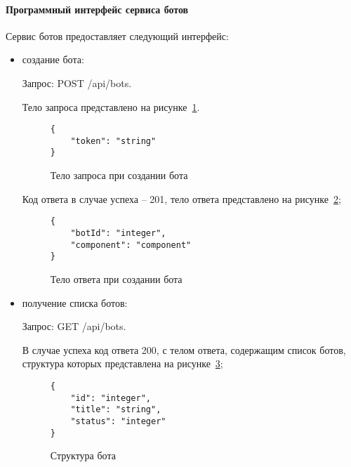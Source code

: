 \paragraph{Программный интерфейс сервиса ботов}

Сервис ботов предоставляет следующий интерфейс:
\begin{itemize}
	\item создание бота:

	      Запрос: POST /api/bots.

	      Тело запроса представлено на рисунке~\ref{f:add-bot-request-body}.

	      \begin{figure}[ht]
		      \centering
		      \vspace{\toppaddingoffigure}
		      \begin{lstlisting}
{
    "token": "string"
}
    \end{lstlisting}
		      \caption{Тело запроса при создании бота}
		      \label{f:add-bot-request-body}
	      \end{figure}

	      Код ответа в случае успеха – 201, тело ответа представлено на
	      рисунке~\ref{f:add-bot-response-body};

	      \begin{figure}[ht]
		      \centering
		      \vspace{\toppaddingoffigure}
		      \begin{lstlisting}
{
    "botId": "integer",
    "component": "component"
}
    \end{lstlisting}
		      \caption{Тело ответа при создании бота}
		      \label{f:add-bot-response-body}
	      \end{figure}

	\item получение списка ботов:

	      Запрос: GET /api/bots.

	      В случае успеха код ответа 200, с телом ответа, содержащим список
	      ботов, структура которых представлена
	      на рисунке~\ref{f:get-bot-response-body};


	      \begin{figure}[ht]
		      \centering
		      \vspace{\toppaddingoffigure}
		      \begin{lstlisting}
{
    "id": "integer",
    "title": "string",
    "status": "integer"
}
    \end{lstlisting}
		      \caption{Структура бота}
		      \label{f:get-bot-response-body}
	      \end{figure}


\end{itemize}
